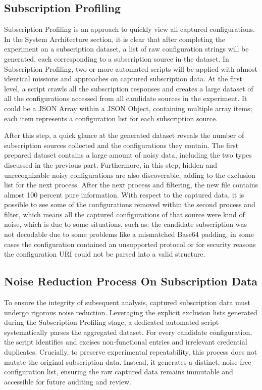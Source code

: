 \documentclass[10pt,conference]{IEEEtran}
\begin{document}
\subsection{Subscription Profiling}
Subscription Profiling is an approach to quickly view all captured configurations.
In the System Architecture section, it is clear that after completing the experiment on a subscription dataset, a list of raw configuration strings will be generated, each corresponding to a subscription source in the dataset.
In Subscription Profiling, two or more automated scripts will be applied with almost identical missions and approaches on captured subscription data.
At the first level, a script crawls all the subscription responses and creates a large dataset of all the configurations accessed from all candidate sources in the experiment.
It could be a JSON Array within a JSON Object, containing multiple array items; each item represents a configuration list for each subscription source.

After this step, a quick glance at the generated dataset reveals the number of subscription sources collected and the configurations they contain.
The first prepared dataset contains a large amount of noisy data, including the two types discussed in the previous part.
Furthermore, in this step, hidden and unrecognizable noisy configurations are also discoverable, adding to the exclusion list for the next process.
After the next process and filtering, the new file contains almost 100 percent pure information.
With respect to the captured data, it is possible to see some of the configurations removed within the second process and filter, which means all the captured configurations of that source were kind of noise, which is due to some situations, such as: the candidate subscription was not decodable due to some problems like a mismatched Base64 padding, in some cases the configuration contained an unsupported protocol or for security reasons the configuration URI could not be parsed into a valid structure.

\subsection{Noise Reduction Process On Subscription Data}
To ensure the integrity of subsequent analysis, captured subscription data must undergo rigorous noise reduction.
Leveraging the explicit exclusion lists generated during the Subscription Profiling stage, a dedicated automated script systematically parses the aggregated dataset.
For every candidate configuration, the script identifies and excises non-functional entries and irrelevant credential duplicates.
Crucially, to preserve experimental repeatability, this process does not mutate the original subscription data.
Instead, it generates a distinct, noise-free configuration list, ensuring the raw captured data remains immutable and accessible for future auditing and review.
\end{document}

